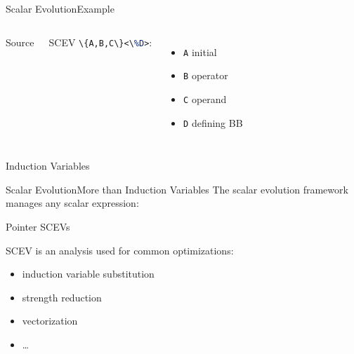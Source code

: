 \documentclass[10pt,mathserif]{beamer}
\newcommand{\cinput}[1]{}
\newcommand{\llvminput}[1]{}
\newcommand{\llvminline}[1]{\lstinline[language=LLVM]!#1!}
\begin{document}
\begin{frame}{Scalar Evolution}{Example}
\begin{columns}
\begin{block}{Source}
\centering
\cinput{snippet/02/nested-scev.c}
\end{block}

SCEV \llvminline{\{A,B,C\}<\%D>}:

\begin{itemize}
\item \llvminline{A} initial
\item \llvminline{B} operator
\item \llvminline{C} operand
\item \llvminline{D} defining BB
\end{itemize}
\end{columns}

\begin{block}{Induction Variables}
\centering
\llvminput{snippet/02/nested-scev-induction.ll}
\end{block}
\end{frame}

\begin{frame}{Scalar Evolution}{More than Induction Variables}
The scalar evolution framework manages \alert{any scalar expression}:

\begin{block}{Pointer SCEVs}
\centering
\llvminput{snippet/02/nested-scev-pointer.ll}
\end{block}

SCEV is an analysis used for common optimizations:

\begin{itemize}
\item induction variable substitution
\item strength reduction
\item vectorization
\item \ldots
\end{itemize}
\end{frame}
\end{document}
